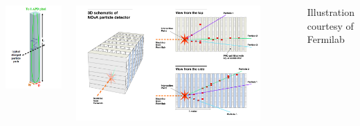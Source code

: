\documentclass[10pt,professionalfonts,xcolor=table]{beamer}
\begin{document}
{\begin{columns}[c]
 \includegraphics[width=1\textwidth]{figures/figures/cell.png}

\centering
 \includegraphics[width=0.85\textwidth]{figures/figures/schematic.jpg}

 {\scriptsize Illustration courtesy of Fermilab}

\end{columns}




}
\end{document}
